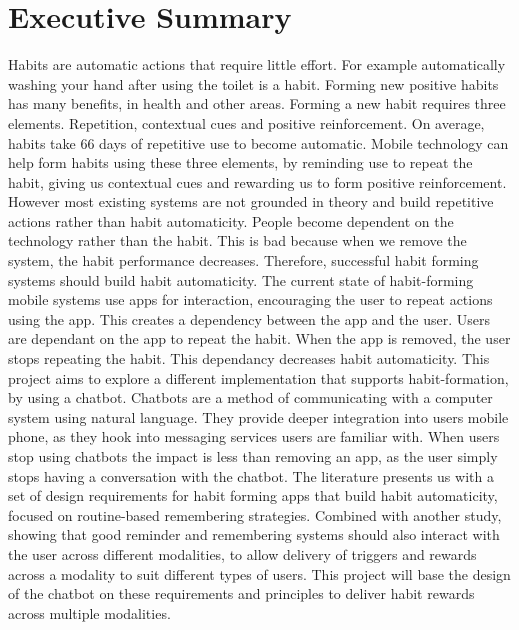 \section*{Executive Summary}

Habits are automatic actions that require little effort. For example automatically washing your hand after using the toilet is a habit. Forming new positive habits has many benefits, in health and other areas. Forming a new habit requires three elements. Repetition, contextual cues and positive reinforcement. On average, habits take 66 days of repetitive use to become automatic.\newline
\newline
Mobile technology can help form habits using these three elements, by reminding use to repeat the habit, giving us contextual cues and rewarding us to form positive reinforcement. However most existing systems are not grounded in theory and build repetitive actions rather than habit automaticity. People become dependent on the technology rather than the habit. This is bad because when we remove the system, the habit performance decreases. Therefore, successful habit forming systems should build habit automaticity.\newline
\newline
The current state of habit-forming mobile systems use apps for interaction, encouraging the user to repeat actions using the app. This creates a dependency between the app and the user. Users are dependant on the app to repeat the habit. When the app is removed, the user stops repeating the habit. This dependancy decreases habit automaticity.\newline
\newline
This project aims to explore a different implementation that supports habit-formation, by using a chatbot. Chatbots are a method of communicating with a computer system using natural language. They provide deeper integration into users mobile phone, as they hook into messaging services users are familiar with. When users stop using chatbots the impact is less than removing an app, as the user simply stops having a conversation with the chatbot.\newline
\newline
The literature presents us with a set of design requirements for habit forming apps that build habit automaticity, focused on routine-based remembering strategies. Combined with another study, showing that good reminder and remembering systems should also interact with the user across different modalities, to allow delivery of triggers and rewards across a modality to suit different types of users. This project will base the design of the chatbot on these requirements and principles to deliver habit rewards across multiple modalities.\newline
